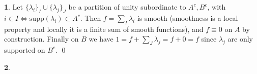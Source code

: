 \documentclass[10.5pt]{article}
\theoremstyle{definition}
\newtheorem{pb}{}
\newcommand{\set}[1]{\{#1\}}
\begin{document}
    \begin{pb}
        Let \(\set{\lambda_i}_I\cup\set{\lambda_j}_J\) be a partition of unity subordinate to \(A^c, B^c\), with \(i \in I \iff \text{supp}(\lambda_i) \subset A^c\). Then \(f = \sum_I \lambda_i\) is smooth (smoothness is a local property and locally it is a finite sum of smooth functions), and \(f \equiv 0\) on \(A\) by construction. Finally on \(B\) we have \(1 = f + \sum_J \lambda_j = f + 0 = f\) since \(\lambda_j\) are only supported on \(B^c\). \qed 
    \end{pb}
    \begin{pb}
        
    \end{pb}
\end{document}
